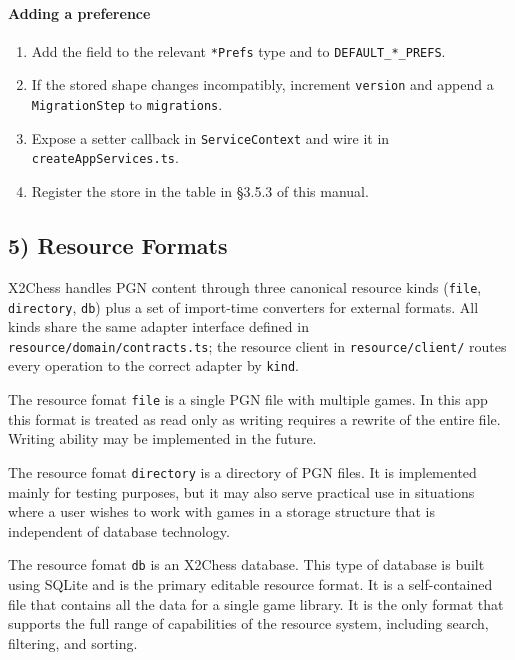 \documentclass[]{article}
\providecommand{\tightlist}{%
  \setlength{\itemsep}{0pt}\setlength{\parskip}{0pt}}
\let\oldparagraph\paragraph
\renewcommand{\paragraph}[1]{\oldparagraph{#1}\mbox{}}
\begin{document}
\paragraph{Adding a preference}\label{adding-a-preference}

\begin{enumerate}
\def\labelenumi{\arabic{enumi}.}
\tightlist
\item
  Add the field to the relevant \texttt{*Prefs} type and to
  \texttt{DEFAULT\_*\_PREFS}.
\item
  If the stored shape changes incompatibly, increment \texttt{version}
  and append a \texttt{MigrationStep} to \texttt{migrations}.
\item
  Expose a setter callback in \texttt{ServiceContext} and wire it in
  \texttt{createAppServices.ts}.
\item
  Register the store in the table in §3.5.3 of this manual.
\end{enumerate}

\subsection{5) Resource Formats}\label{resource-formats}

X2Chess handles PGN content through three canonical resource kinds
(\texttt{file}, \texttt{directory}, \texttt{db}) plus a set of
import-time converters for external formats. All kinds share the same
adapter interface defined in \texttt{resource/domain/contracts.ts}; the
resource client in \texttt{resource/client/} routes every operation to
the correct adapter by \texttt{kind}.

The resource fomat \texttt{file} is a single PGN file with multiple
games. In this app this format is treated as read only as writing
requires a rewrite of the entire file. Writing ability may be
implemented in the future.

The resource fomat \texttt{directory} is a directory of PGN files. It is
implemented mainly for testing purposes, but it may also serve practical
use in situations where a user wishes to work with games in a storage
structure that is independent of database technology.

The resource fomat \texttt{db} is an X2Chess database. This type of
database is built using SQLite and is the primary editable resource
format. It is a self-contained file that contains all the data for a
single game library. It is the only format that supports the full range
of capabilities of the resource system, including search, filtering, and
sorting.
\end{document}
